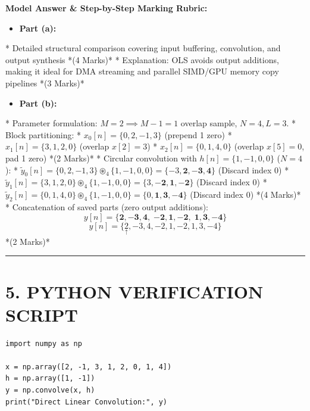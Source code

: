 \documentclass[11pt,a4paper]{article}
\begin{document}
\textbf{Model Answer \& Step-by-Step Marking Rubric:}
\begin{itemize}
\item \textbf{Part (a):}
\end{itemize}
  * Detailed structural comparison covering input buffering, convolution, and output synthesis *(4 Marks)*
  * Explanation: OLS avoids output additions, making it ideal for DMA streaming and parallel SIMD/GPU memory copy pipelines *(3 Marks)*
\begin{itemize}
\item \textbf{Part (b):}
\end{itemize}
  * Parameter formulation: $M = 2 \implies M - 1 = 1$ overlap sample, $N = 4, L = 3$.
  * Block partitioning:
    * $x_0[n] = \{ 0, 2, -1, 3 \}$ (prepend 1 zero)
    * $x_1[n] = \{ 3, 1, 2, 0 \}$ (overlap $x[2]=3$)
    * $x_2[n] = \{ 0, 1, 4, 0 \}$ (overlap $x[5]=0$, pad 1 zero) *(2 Marks)*
  * Circular convolution with $h[n] = \{ 1, -1, 0, 0 \}$ ($N = 4$):
    * $\tilde{y}_0[n] = \{ 0, 2, -1, 3 \} \circledast_4 \{ 1, -1, 0, 0 \} = \{ -3, \mathbf{2, -3, 4} \}$ (Discard index 0)
    * $\tilde{y}_1[n] = \{ 3, 1, 2, 0 \} \circledast_4 \{ 1, -1, 0, 0 \} = \{ 3, \mathbf{-2, 1, -2} \}$ (Discard index 0)
    * $\tilde{y}_2[n] = \{ 0, 1, 4, 0 \} \circledast_4 \{ 1, -1, 0, 0 \} = \{ 0, \mathbf{1, 3, -4} \}$ (Discard index 0) *(4 Marks)*
  * Concatenation of saved parts (zero output additions):
    $$ y[n] = \{ \mathbf{2, -3, 4}, \; \mathbf{-2, 1, -2}, \; \mathbf{1, 3, -4} \} $$
    $$ y[n] = \{ \underset{\uparrow}{2}, -3, 4, -2, 1, -2, 1, 3, -4 \} $$ *(2 Marks)*

\noindent\rule{\textwidth}{0.5pt}
\section*{5. PYTHON VERIFICATION SCRIPT}
\begin{verbatim}
import numpy as np

x = np.array([2, -1, 3, 1, 2, 0, 1, 4])
h = np.array([1, -1])
y = np.convolve(x, h)
print("Direct Linear Convolution:", y)
\end{verbatim}
\end{document}
